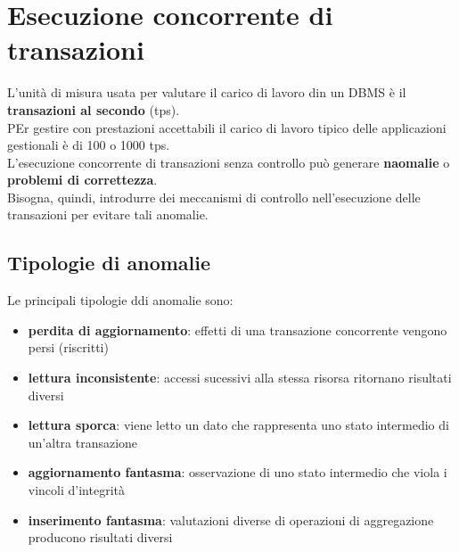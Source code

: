 
\chapter{Esecuzione concorrente di transazioni}
L'unità di misura usata per valutare il carico di lavoro din un DBMS è il \textcolor{azzurrino}{\textbf{transazioni al secondo}} (tps).\\[0.2ex]
PEr gestire con prestazioni accettabili il carico di lavoro tipico delle applicazioni gestionali è di 100 o 1000 tps.\\[0.2ex]
L'esecuzione concorrente di transazioni senza controllo può generare \textbf{naomalie} o \textbf{problemi di correttezza}.\\[0.2ex]
Bisogna, quindi, introdurre dei meccanismi di controllo nell'esecuzione delle transazioni per evitare tali anomalie.

\section{Tipologie di anomalie}
Le principali tipologie ddi anomalie sono:
\begin{itemize}[label=$\triangleright$, itemsep=\smallskipamount]
    \item \textbf{perdita di aggiornamento}: effetti di una transazione concorrente vengono persi (riscritti)
    \item \textbf{lettura inconsistente}: accessi sucessivi alla stessa risorsa ritornano risultati diversi
    \item \textbf{lettura sporca}: viene letto un dato che rappresenta uno stato intermedio di un'altra transazione
    \item \textbf{aggiornamento fantasma}: osservazione di uno stato intermedio che viola i vincoli d'integrità
    \item \textbf{inserimento fantasma}: valutazioni diverse di operazioni di aggregazione producono risultati diversi
\end{itemize}


